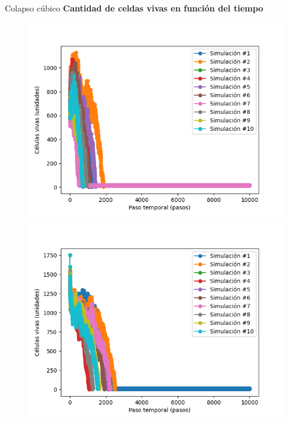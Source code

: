 \begin{frame}{Colapso cúbico}
    \textbf{Cantidad de celdas vivas en función del tiempo}
    {\small
    \begin{multicols}{3}
        {
            \begin{figure}[H]
                \centering
                \includegraphics[width=0.8\linewidth]{pic/collapse3d/size_i10}
                \label{fig:colapso:size:i10}
            \end{figure}
        }

        {
            \begin{figure}[H]
                \centering
                \includegraphics[width=0.8\linewidth]{pic/collapse3d/size_i30}
                \label{fig:colapso:size:i30}
            \end{figure}
        }


\end{multicols}}
\end{frame}
